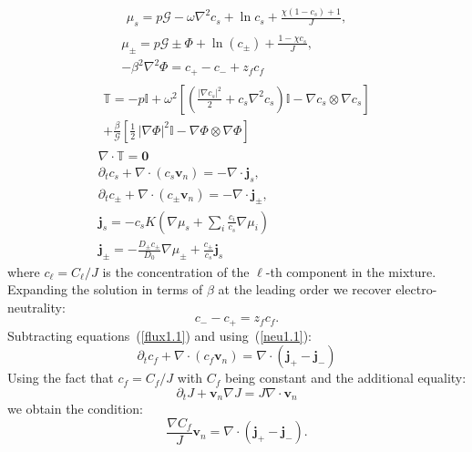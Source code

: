 \documentclass[12pt]{extarticle}
\begin{document}
\begin{gather}
\begin{aligned}
\mu_s = p \mathcal{G}- \omega\nabla^2c_s + \ln c_s+\frac{\chi(1-c_s)+1}{J},
\end{aligned}\\[2.5mm]
\mu_\pm = p \mathcal{G} \pm \Phi + \ln (c_\pm) +\frac{1-\chi c_s}{J},\\ 
-\beta^2 \nabla^2 \Phi = c_+-c_-+z_fc_f\, 
\end{gather}
\begin{gather}
\begin{aligned}
\mathbb{T}= -p \mathbb{I} +  \omega^2\left[\left(\frac{|\nabla c_s|^2}{2}+c_s\nabla^2c_s\right)\mathbb{I} - \nabla c_s \otimes \nabla c_s\right]\\
+ \frac{\beta}{\mathcal{G}} \left[\frac{1}{2} \,|\nabla \Phi|^2\mathbb{I} -\nabla \Phi \otimes \nabla \Phi\right]
\end{aligned}\\
\nabla \cdot \mathbb{T}=\mathbf{0}\\
\partial_t c_s + \nabla \cdot(c_s \mathbf{v}_n)=- \nabla \cdot\mathbf{j}_s,\\
\partial_t c_\pm + \nabla \cdot(c_\pm \mathbf{v}_n)= -\nabla\cdot\mathbf{j}_\pm,\label{flux1.1}\\
\mathbf{j}_s =-c_sK  \left(\nabla \mu_s +\sum_i \frac{c_i}{c_s} \nabla \mu_i\right)\\
\mathbf{j}_\pm= - \frac{D_\pm c_\pm}{D_0}\nabla \mu_\pm + \frac{c_\pm}{c_s}\mathbf{j}_s
\end{gather}
where $c_\ell=C_\ell/J$ is the concentration of the $\ell$-th component in the mixture.
Expanding the solution in terms of $\beta$ at the leading order we recover electro-neutrality:
\begin{equation}
c_- - c_+=z_f c_f. \label{neu1.1}
\end{equation}
Subtracting equations~(\ref{flux1.1}) and using~(\ref{neu1.1}):
\begin{equation}
\partial_t c_f +\nabla \cdot(c_f \mathbf{v}_n)= \nabla\cdot(\mathbf{j}_+-\mathbf{j}_-)
\end{equation}
Using the fact that $c_f=C_f/J$ with $C_f$ being constant and the additional equality:
\begin{equation}
\partial_t J + \mathbf{v}_n \nabla J=J\nabla \cdot\mathbf{v}_n
\end{equation}
we obtain the condition:
\begin{equation}
\frac{\nabla C_f}{J}\mathbf{v}_n= \nabla\cdot(\mathbf{j}_+-\mathbf{j}_-).
\end{equation}
\end{document}
